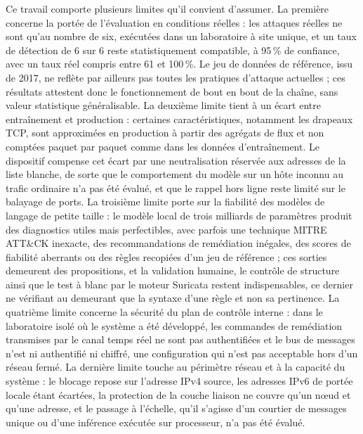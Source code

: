 Ce travail comporte plusieurs limites qu'il convient d'assumer. La première concerne la portée de l'évaluation en conditions réelles : les attaques réelles ne sont qu'au nombre de six, exécutées dans un laboratoire à site unique, et un taux de détection de 6 sur 6 reste statistiquement compatible, à 95\,\% de confiance, avec un taux réel compris entre 61 et 100\,\%. Le jeu de données de référence, issu de 2017, ne reflète par ailleurs pas toutes les pratiques d'attaque actuelles ; ces résultats attestent donc le fonctionnement de bout en bout de la chaîne, sans valeur statistique généralisable. La deuxième limite tient à un écart entre entraînement et production : certaines caractéristiques, notamment les drapeaux TCP, sont approximées en production à partir des agrégats de flux et non comptées paquet par paquet comme dans les données d'entraînement. Le dispositif compense cet écart par une neutralisation réservée aux adresses de la liste blanche, de sorte que le comportement du modèle sur un hôte inconnu au trafic ordinaire n'a pas été évalué, et que le rappel hors ligne reste limité sur le balayage de ports. La troisième limite porte sur la fiabilité des modèles de langage de petite taille : le modèle local de trois milliards de paramètres produit des diagnostics utiles mais perfectibles, avec parfois une technique MITRE ATT\&CK inexacte, des recommandations de remédiation inégales, des scores de fiabilité aberrants ou des règles recopiées d'un jeu de référence ; ces sorties demeurent des propositions, et la validation humaine, le contrôle de structure ainsi que le test à blanc par le moteur Suricata restent indispensables, ce dernier ne vérifiant au demeurant que la syntaxe d'une règle et non sa pertinence. La quatrième limite concerne la sécurité du plan de contrôle interne : dans le laboratoire isolé où le système a été développé, les commandes de remédiation transmises par le canal temps réel ne sont pas authentifiées et le bus de messages n'est ni authentifié ni chiffré, une configuration qui n'est pas acceptable hors d'un réseau fermé. La dernière limite touche au périmètre réseau et à la capacité du système : le blocage repose sur l'adresse IPv4 source, les adresses IPv6 de portée locale étant écartées, la protection de la couche liaison ne couvre qu'un nœud et qu'une adresse, et le passage à l'échelle, qu'il s'agisse d'un courtier de messages unique ou d'une inférence exécutée sur processeur, n'a pas été évalué.

